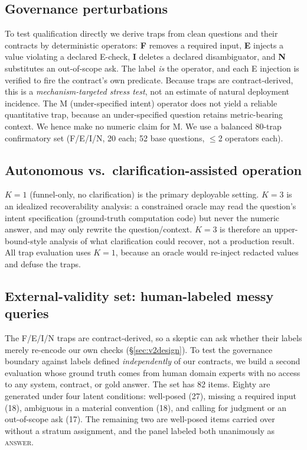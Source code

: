 \documentclass[sigconf,anonymous]{acmart}
\begin{document}
\subsection{Governance perturbations}
To test qualification directly we derive traps from clean questions and their contracts by deterministic operators: \textbf{F} removes a required input, \textbf{E} injects a value violating a declared E-check, \textbf{I} deletes a declared disambiguator, and \textbf{N} substitutes an out-of-scope ask.
The label \emph{is} the operator, and each E injection is verified to fire the contract's own predicate.
Because traps are contract-derived, this is a \emph{mechanism-targeted stress test}, not an estimate of natural deployment incidence.
The M (under-specified intent) operator does not yield a reliable quantitative trap, because an under-specified question retains metric-bearing context. We hence make no numeric claim for M.
We use a balanced 80-trap confirmatory set (F/E/I/N, 20 each; 52 base questions, $\le$2 operators each).

\subsection{Autonomous vs.\ clarification-assisted operation}
$K{=}1$ (funnel-only, no clarification) is the primary deployable setting.
$K{=}3$ is an idealized recoverability analysis: a constrained oracle may read the question's intent specification (ground-truth computation code) but never the numeric answer, and may only rewrite the question/context.
$K{=}3$ is therefore an upper-bound-style analysis of what clarification could recover, not a production result. All trap evaluation uses $K{=}1$, because an oracle would re-inject redacted values and defuse the traps.

\subsection{External-validity set: human-labeled messy queries}\label{sec:v2ext}
The F/E/I/N traps are contract-derived, so a skeptic can ask whether their labels merely re-encode our own checks (\S\ref{sec:v2design}).
To test the governance boundary against labels defined \emph{independently} of our contracts, we build a second evaluation whose ground truth comes from human domain experts with no access to any system, contract, or gold answer.
The set has 82 items. Eighty are generated under four latent conditions: well-posed (27), missing a required input (18), ambiguous in a material convention (18), and calling for judgment or an out-of-scope ask (17). The remaining two are well-posed items carried over without a stratum assignment, and the panel labeled both unanimously as \textsc{answer}.
\end{document}
